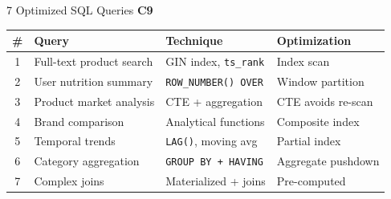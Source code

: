 \documentclass[aspectratio=169, 10pt]{beamer}
\newcommand{\competency}[1]{\textbf{\color{ntblue}#1}}
\begin{document}
\begin{frame}{7 Optimized SQL Queries \competency{C9}}
\small
\begin{center}
\begin{tabular}{clll}
  \toprule
  \textbf{\#} & \textbf{Query} & \textbf{Technique} & \textbf{Optimization} \\
  \midrule
  1 & Full-text product search & GIN index, \texttt{ts\_rank} & Index scan \\
  2 & User nutrition summary & \texttt{ROW\_NUMBER() OVER} & Window partition \\
  3 & Product market analysis & CTE + aggregation & CTE avoids re-scan \\
  4 & Brand comparison & Analytical functions & Composite index \\
  5 & Temporal trends & \texttt{LAG()}, moving avg & Partial index \\
  6 & Category aggregation & \texttt{GROUP BY + HAVING} & Aggregate pushdown \\
  7 & Complex joins & Materialized + joins & Pre-computed \\
  \bottomrule
\end{tabular}
\end{center}
\vspace{0.15cm}
\begin{center}
\end{center}
\end{frame}
\end{document}
